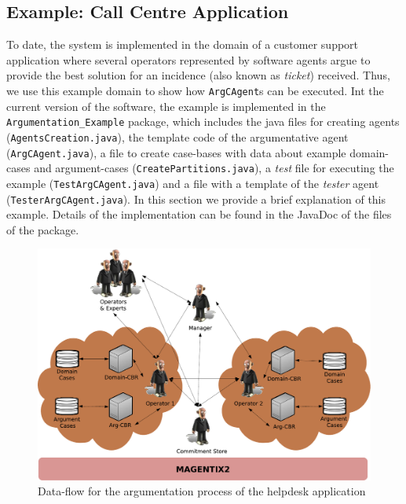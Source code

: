 \subsection{Example: Call Centre Application}
\label{subsubsec:callCentre}

To date, the system is implemented in the domain of a customer support application where several operators represented by software agents argue to provide the best solution for an incidence (also known as \emph{ticket}) received. Thus, we use this example domain to show how \texttt{ArgCAgent}s can be executed. Int the current version of the software, the example is implemented in the \texttt{Argumentation\_Example} package, which includes the java files for creating agents (\lstinline{AgentsCreation.java}), the template code of the argumentative agent (\lstinline{ArgCAgent.java}), a file to create case-bases with data about example domain-cases and argument-cases (\lstinline{CreatePartitions.java}), a \emph{test} file for executing the example (\lstinline{TestArgCAgent.java}) and a file with a template of the \emph{tester} agent (\lstinline{TesterArgCAgent.java}). In this section we provide a brief explanation of this example. Details of the implementation can be found in the JavaDoc of the files of the package.

\begin{figure}
  \centering
    \includegraphics[width=0.8\linewidth]{ProgrammingAgents/images/callCenter}
  \caption{Data-flow for the argumentation process of the helpdesk application}
\label{fig:callcentre}
\end{figure}

